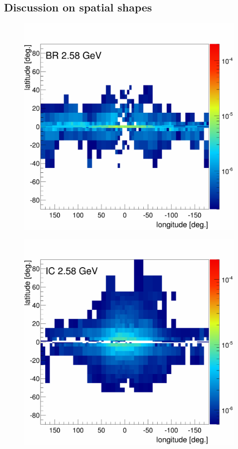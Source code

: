 \subsection{Discussion on spatial shapes}
\begin{figure}[h]
  \centering
  \begin{minipage}[h]{0.45\textwidth}
  	\centering
	\includegraphics[width=1.\linewidth]{pic/results/MCRonly_BR_fluxE12_skymap.png}
  	\label{fig:MCRonly_skymap_BR}
  \end{minipage}
  \hfill
  \begin{minipage}[h]{0.45\textwidth}
  	\centering
	\includegraphics[width=1.\linewidth]{pic/results/MCRonly_IC_fluxE12_skymap.png}

\end{minipage}
\end{figure}
